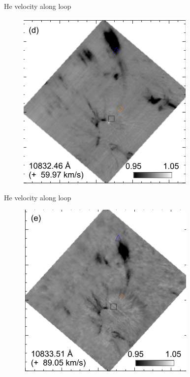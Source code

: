 \documentclass{beamer}
\begin{document}
\begin{frame}{He velocity along loop}
 
\begin{figure}[H]
 \centering
 \includegraphics[scale=0.6]{spd.png}
\end{figure}

\end{frame}


\begin{frame}{He velocity along loop}
 
\begin{figure}[H]
 \centering
 \includegraphics[scale=0.6]{spe.png}
\end{figure}

\end{frame}
\end{document}
